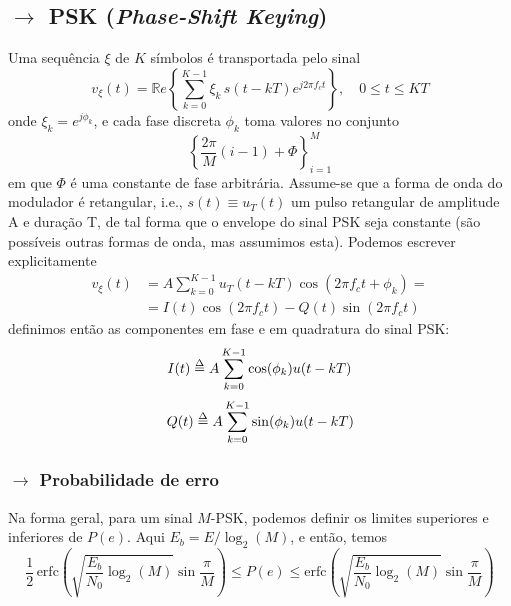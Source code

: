 \clearpage
\subsection[5.2 PSK (\textit{Phase-Shift Keying})]{$\rightarrow$ PSK (\textit{Phase-Shift Keying})}
\label{subsec:M-PSK}
\begin{mdframed}
Uma sequência $\xi$ de $K$ símbolos é transportada pelo sinal
$$
    v_\xi(t) = \mathbb{R}e\left\{ \sum_{k=0}^{K-1} \xi_k\, s(t-kT) e^{j2\pi f_c t} \right\},\quad 0 \leq t \leq KT
$$
onde $\xi_k = e^{j\phi_k}$, e cada fase discreta $\phi_k$ toma valores no conjunto
$$
    \left\{ \frac{2\pi}{M}(i-1) + \Phi \right\}_{i=1}^{M}
$$
em que $\Phi$ é uma constante de fase arbitrária. Assume-se que a forma de onda do modulador é retangular, i.e., $s(t) \equiv u_T(t)$ um pulso retangular de amplitude A e duração T, de tal forma que o envelope do sinal PSK seja constante (são possíveis outras formas de onda, mas assumimos esta). Podemos escrever explicitamente
\begin{align*}
    v_\xi(t) &= A\sum_{k=0}^{K-1} u_T(t-kT)\cos(2\pi f_c t + \phi_k) = \\
    &= I(t) \cos(2\pi f_c t) - Q(t) \sin(2\pi f_c t)
\end{align*}
definimos então as componentes em fase e em quadratura do sinal PSK:
$$
    I(t) \delequal A\sum_{k=0}^{K-1} \cos(\phi_k) u(t-kT)
$$
$$
    Q(t) \delequal A\sum_{k=0}^{K-1} \sin(\phi_k) u(t-kT)
$$
\end{mdframed}
\vspace{-1em}
\subsubsection[5.2.1 Probabilidade de erro]{$\rightarrow$ Probabilidade de erro}
Na forma geral, para um sinal $M$-PSK, podemos definir os limites superiores e inferiores de $P(e)$. Aqui $E_b = E/\log_2(M)$, e então, temos
$$
    \frac{1}{2}\, \text{erfc}\left( \sqrt{\frac{E_b}{N_0}\log_2(M)} \sin{\frac{\pi}{M}} \right) \leq P(e) \leq \text{erfc}\left( \sqrt{\frac{E_b}{N_0}\log_2(M)} \sin{\frac{\pi}{M}} \right)
$$

\renewcommand*{\thefootnote}{\fnsymbol{footnote}}
\renewcommand*{\thefootnote}{\arabic{footnote}}
\vspace{-1em}
